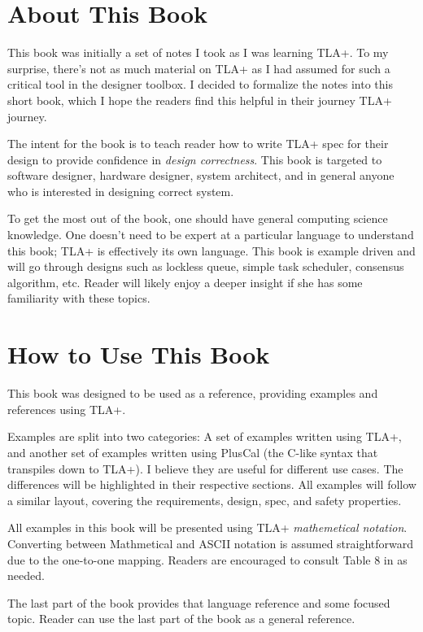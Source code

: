 \section{About This Book}

This book was initially a set of notes I took as I was learning TLA+. To my
surprise, there's not as much material on TLA+ as I had assumed for such a
critical tool in the designer toolbox. I decided to formalize the notes into
this short book, which I hope the readers find this helpful in their journey
TLA+ journey.\newline

The intent for the book is to teach reader how to write TLA+ spec for their
design to provide confidence in \textit{design correctness}. This book is
targeted to software designer, hardware designer, system architect, and in
general anyone who is interested in designing correct system.\newline 

To get the most out of the book, one should have general computing science
knowledge. One doesn't need to be expert at a particular language to understand
this book; TLA+ is effectively its own language. This book is example driven and
will go through designs such as lockless queue, simple task scheduler, consensus
algorithm, etc. Reader will likely enjoy a deeper insight if she has some
familiarity with these topics.

\section{How to Use This Book}

This book was designed to be used as a reference, providing examples and
references using TLA+.\newline

Examples are split into two categories: A set of examples written using TLA+,
and another set of examples written using PlusCal (the C-like syntax that
transpiles down to TLA+). I believe they are useful for different use cases.
The differences will be highlighted in their respective sections. All examples
will follow a similar layout, covering the requirements, design, spec, and 
safety properties.\newline

All examples in this book will be presented using TLA+ \textit{mathemetical
notation}. Converting between Mathmetical and ASCII notation is assumed
straightforward due to the one-to-one mapping. Readers are encouraged to consult
Table 8 in \cite{ss} as needed.\newline

The last part of the book provides that language reference and some focused
topic. Reader can use the last part of the book as a general reference. 

